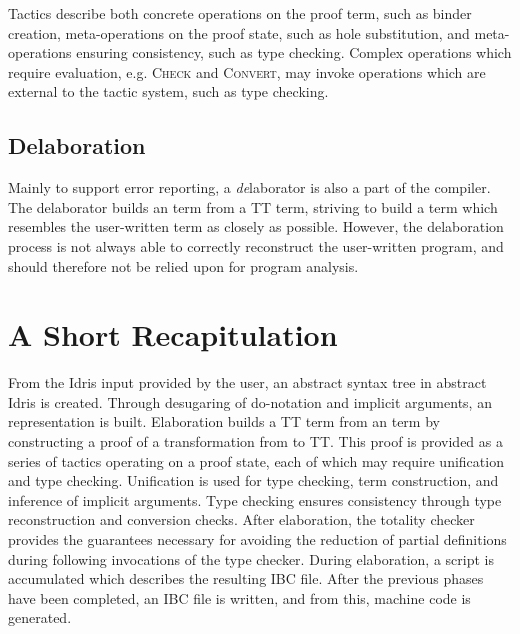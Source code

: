 Tactics describe both concrete operations on the proof term, such as binder
creation, meta-operations on the proof state, such as hole substitution, and
meta-operations ensuring consistency, such as type checking. Complex
operations which require evaluation, e.g. \textsc{Check} and \textsc{Convert},
may invoke operations which are external to the tactic system, such as type
checking.

\subsection{Delaboration}
Mainly to support error reporting, a \emph{de}laborator is also a part of the
compiler. The delaborator builds an \IdrisM{} term from a TT term, striving to
build a term which resembles the user-written term as closely as
possible. However, the delaboration process is not always able to correctly
reconstruct the user-written program, and should therefore not be relied upon
for program analysis.

\section{A Short Recapitulation}
From the Idris input provided by the user, an abstract syntax tree in abstract
Idris is created. Through desugaring of do-notation and implicit arguments, an
\IdrisM{} representation is built. Elaboration builds a TT term from an
\IdrisM{} term by constructing a proof of a transformation from \IdrisM{} to
TT. This proof is provided as a series of tactics operating on a proof state,
each of which may require unification and type checking. Unification is used for
type checking, term construction, and inference of implicit arguments. Type
checking ensures consistency through type reconstruction and conversion
checks. After elaboration, the totality checker provides the guarantees
necessary for avoiding the reduction of partial definitions during following
invocations of the type checker. During elaboration, a script is accumulated
which describes the resulting IBC file. After the previous phases have been
completed, an IBC file is written, and from this, machine code is generated.










